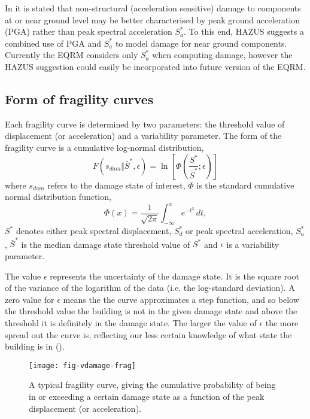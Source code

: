 In \citet[pages 5-19]{dr_FEMA99b} it is stated that non-structural
(acceleration sensitive) damage to components at or near ground
level may be better characterised by peak ground acceleration
(PGA) rather than peak spectral acceleration $S^*_a$. To this end,
HAZUS suggests a combined use of PGA and $S^*_a$ to model damage
for near ground components. Currently the EQRM considers only
$S^*_a$ when computing damage, however the HAZUS suggestion could
easily be incorporated into future version of the EQRM.


\subsection{Form of fragility curves}

Each fragility curve is determined by two
parameters: the threshold value of displacement (or acceleration)
and a variability parameter. The form of the fragility
curve is a cumulative log-normal
distribution,
\begin{equation}
\label{eq:vdamage-frag} F(s_{dam} \Vert \bar S^*,\epsilon) =
\ln\left[\Phi\left(\frac{S^*}{\bar S^*}; \epsilon\right)\right]
\end{equation}
where $s_{dam}$ refers to the damage state of interest, $\Phi$ is
the standard cumulative normal distribution function,
$$
 \Phi(x) = \frac{1}{\sqrt{2\pi}}\int_{-\infty}^x e^{-t^2}\,dt,
$$
$S^*$ denotes either peak spectral displacement, $S_d^*$ or peak spectral acceleration,
$S_a^*$, $\bar S^*$ is the median damage state threshold value of
$S^*$ and $\epsilon$ is a variability parameter.

The value $\epsilon$ represents the uncertainty of the damage
state. It is the square root of the variance of the logarithm of
the data (i.e. the log-standard deviation). A zero value for
$\epsilon$ means the the curve approximates a step function, and
so below the threshold value the building is not in the given
damage state and above the threshold it is definitely in the
damage state. The larger the value of $\epsilon$ the more spread
out the curve is, reflecting our less certain knowledge of what
state the building is in ().


\begin{figure}[htp]
\label{fig:dam-fragility-var-dstate} \centering
{}
 
\texttt{[image: fig-vdamage-frag]}
\caption{A typical fragility curve, giving
the cumulative probability of
  being in or exceeding
  a certain damage state as a function of the
 peak displacement (or acceleration).}
\label{fig:vdamage-frag}
\end{figure}

